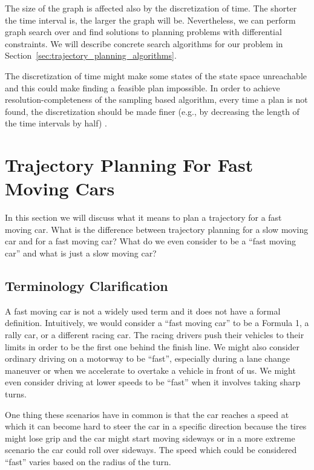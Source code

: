 The size of the graph is affected also by the discretization of time. The shorter the time interval is, the larger the graph will be. Nevertheless, we can perform graph search over and find solutions to planning problems with differential constraints. We will describe concrete search algorithms for our problem in Section~\ref{sec:trajectory_planning_algorithms}.

The discretization of time might make some states of the state space unreachable and this could make finding a feasible plan impossible. In order to achieve resolution-completeness of the sampling based algorithm, every time a plan is not found, the discretization should be made finer (e.g., by decreasing the length of the time intervals by half) \cite[Chapter~14.2]{lavalle_2006}.

\section{Trajectory Planning For Fast Moving Cars}

In this section we will discuss what it means to plan a trajectory for a fast moving car. What is the difference between trajectory planning for a slow moving car and for a fast moving car? What do we even consider to be a ``fast moving car'' and what is just a slow moving car?

\subsection{Terminology Clarification}

A fast moving car is not a widely used term and it does not have a formal definition. Intuitively, we would consider a ``fast moving car'' to be a Formula 1, a rally car, or a different racing car. The racing drivers push their vehicles to their limits in order to be the first one behind the finish line. We might also consider ordinary driving on a motorway to be ``fast'', especially during a lane change maneuver or when we accelerate to overtake a vehicle in front of us. We might even consider driving at lower speeds to be ``fast'' when it involves taking sharp turns.

One thing these scenarios have in common is that the car reaches a speed at which it can become hard to steer the car in a specific direction because the tires might lose grip and the car might start moving sideways or in a more extreme scenario the car could roll over sideways. The speed which could be considered ``fast'' varies based on the radius of the turn.

